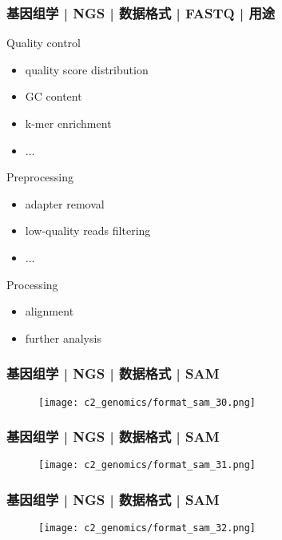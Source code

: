 \begin{frame}
  \frametitle{基因组学 | NGS | 数据格式 | FASTQ | 用途}
  \begin{block}{Quality control}
    \begin{itemize}
      \item quality score distribution
      \item GC content
      \item k-mer enrichment
      \item ...
    \end{itemize}
  \end{block}
  \pause
  \begin{block}{Preprocessing}
    \begin{itemize}
      \item adapter removal
      \item low-quality reads filtering
      \item ...
    \end{itemize}
  \end{block}
  \pause
  \begin{block}{Processing}
    \begin{itemize}
      \item alignment
      \item further analysis
    \end{itemize}
  \end{block}
\end{frame}

\begin{frame}
  \frametitle{基因组学 | NGS | 数据格式 | SAM}
  \begin{figure}
    \centering
    \texttt{[image: c2\_genomics/format\_sam\_30.png]}
  \end{figure}
\end{frame}

\begin{frame}
  \frametitle{基因组学 | NGS | 数据格式 | SAM}
  \begin{figure}
    \centering
    \texttt{[image: c2\_genomics/format\_sam\_31.png]}
  \end{figure}
\end{frame}

\begin{frame}
  \frametitle{基因组学 | NGS | 数据格式 | SAM}
  \begin{figure}
    \centering
    \texttt{[image: c2\_genomics/format\_sam\_32.png]}
  \end{figure}
\end{frame}

